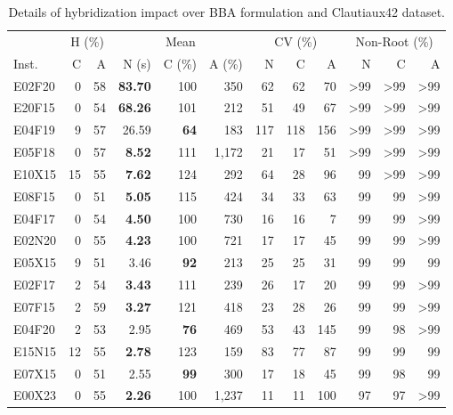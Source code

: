 \documentclass[ppgc,tese,english,formais,babel]{iiufrgs}
\newcommand{\bestcolumnemph}[1]{\textbf{#1}}
\begin{document}
\begin{table}
\caption{Details of hybridization impact over BBA formulation and Clautiaux42 dataset.}
\label{tab:g2opp_multiple_seeds_full_CV_hyb}
\begin{center}
\begin{tabular}{lrrrrrrrrrrr}
\hline\hline
& \multicolumn{2}{c}{H (\%)} & \multicolumn{3}{c}{Mean} & \multicolumn{3}{c}{CV (\%)} & \multicolumn{3}{c}{Non-Root (\%)} \\\cmidrule(lr){2-3}\cmidrule(lr){4-6}\cmidrule(lr){7-9}\cmidrule(lr){10-12}
Inst. & C & A & N (s) & C (\%) & A (\%) & N & C & A & N & C & A \\\hline\hline
E02F20 & 0 & 58 & \bestcolumnemph{83.70} & 100 & 350 & 62 & 62 & 70 & >99 & >99 & >99 \\
E20F15 & 0 & 54 & \bestcolumnemph{68.26} & 101 & 212 & 51 & 49 & 67 & >99 & >99 & >99 \\
E04F19 & 9 & 57 & 26.59 & \bestcolumnemph{64} & 183 & 117 & 118 & 156 & >99 & >99 & >99 \\
E05F18 & 0 & 57 & \bestcolumnemph{8.52} & 111 & 1,172 & 21 & 17 & 51 & >99 & >99 & >99 \\
E10X15 & 15 & 55 & \bestcolumnemph{7.62} & 124 & 292 & 64 & 28 & 96 & 99 & >99 & >99 \\
E08F15 & 0 & 51 & \bestcolumnemph{5.05} & 115 & 424 & 34 & 33 & 63 & 99 & 99 & >99 \\
E04F17 & 0 & 54 & \bestcolumnemph{4.50} & 100 & 730 & 16 & 16 & 7 & 99 & 99 & >99 \\
E02N20 & 0 & 55 & \bestcolumnemph{4.23} & 100 & 721 & 17 & 17 & 45 & 99 & 99 & >99 \\
E05X15 & 9 & 51 & 3.46 & \bestcolumnemph{92} & 213 & 25 & 25 & 31 & 99 & 99 & 99 \\
E02F17 & 2 & 54 & \bestcolumnemph{3.43} & 111 & 239 & 26 & 17 & 20 & 99 & 99 & >99 \\
E07F15 & 2 & 59 & \bestcolumnemph{3.27} & 121 & 418 & 23 & 28 & 26 & 99 & 99 & >99 \\
E04F20 & 2 & 53 & 2.95 & \bestcolumnemph{76} & 469 & 53 & 43 & 145 & 99 & 98 & >99 \\
E15N15 & 12 & 55 & \bestcolumnemph{2.78} & 123 & 159 & 83 & 77 & 87 & 99 & 99 & 99 \\
E07X15 & 0 & 51 & 2.55 & \bestcolumnemph{99} & 300 & 17 & 18 & 45 & 99 & 98 & 99 \\
E00X23 & 0 & 55 & \bestcolumnemph{2.26} & 100 & 1,237 & 11 & 11 & 100 & 97 & 97 & >99 \\

\end{tabular}
\end{center}
\end{table}
\end{document}
